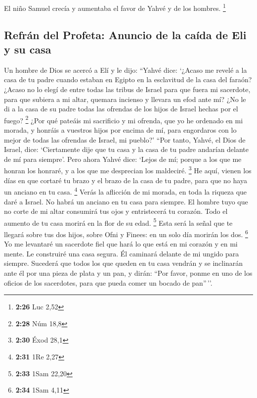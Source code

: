  El niño Samuel crecía y aumentaba el favor de Yahvé y de
los hombres. \footnote{\textbf{2:26} Luc 2,52}

\hypertarget{refruxe1n-del-profeta-anuncio-de-la-cauxedda-de-eli-y-su-casa}{%
\subsection{Refrán del Profeta: Anuncio de la caída de Eli y su
casa}\label{refruxe1n-del-profeta-anuncio-de-la-cauxedda-de-eli-y-su-casa}}

 Un hombre de Dios se acercó a Elí y le dijo: ``Yahvé
dice: `¿Acaso me revelé a la casa de tu padre cuando estaban en Egipto
en la esclavitud de la casa del faraón?  ¿Acaso no lo
elegí de entre todas las tribus de Israel para que fuera mi sacerdote,
para que subiera a mi altar, quemara incienso y llevara un efod ante mí?
¿No le di a la casa de su padre todas las ofrendas de los hijos de
Israel hechas por el fuego? \footnote{\textbf{2:28} Núm 18,8}
 ¿Por qué pateáis mi sacrificio y mi ofrenda, que yo he
ordenado en mi morada, y honráis a vuestros hijos por encima de mí, para
engordaros con lo mejor de todas las ofrendas de Israel, mi pueblo?'
 ``Por tanto, Yahvé, el Dios de Israel, dice:
`Ciertamente dije que tu casa y la casa de tu padre andarían delante de
mí para siempre'. Pero ahora Yahvé dice: `Lejos de mí; porque a los que
me honran los honraré, y a los que me desprecian los maldeciré.
\footnote{\textbf{2:30} Éxod 28,1}  He aquí, vienen los
días en que cortaré tu brazo y el brazo de la casa de tu padre, para que
no haya un anciano en tu casa. \footnote{\textbf{2:31} 1Re 2,27}
 Verás la aflicción de mi morada, en toda la riqueza que
daré a Israel. No habrá un anciano en tu casa para siempre.
 El hombre tuyo que no corte de mi altar consumirá tus
ojos y entristecerá tu corazón. Todo el aumento de tu casa morirá en la
flor de su edad. \footnote{\textbf{2:33} 1Sam 22,20} 
Esta será la señal que te llegará sobre tus dos hijos, sobre Ofni y
Finees: en un solo día morirán los dos. \footnote{\textbf{2:34} 1Sam
  4,11}  Yo me levantaré un sacerdote fiel que hará lo
que está en mi corazón y en mi mente. Le construiré una casa segura. Él
caminará delante de mi ungido para siempre.  Sucederá que
todos los que queden en tu casa vendrán y se inclinarán ante él por una
pieza de plata y un pan, y dirán: ``Por favor, ponme en uno de los
oficios de los sacerdotes, para que pueda comer un bocado de pan''\,''.

